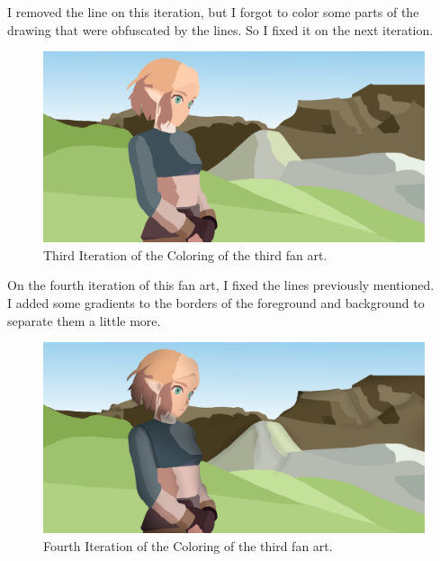 \documentclass{cup-pan}
\begin{document}
        I removed the line on this iteration, but I forgot to color some parts of the drawing that were obfuscated by the lines. So I fixed it on the next iteration.
        \begin{figure}[H]
            \includegraphics[width=\textwidth]{Fanart3/3_Color/III_Color.png}
            \caption{Third Iteration of the Coloring of the third fan art.}
        \end{figure}

        On the fourth iteration of this fan art, I fixed the lines previously mentioned.\\
        I added some gradients to the borders of the foreground and background to separate them a little more.\\
        \begin{figure}[H]
            \includegraphics[width=\textwidth]{Fanart3/3_Color/IIII_Color.png}
            \caption{Fourth Iteration of the Coloring of the third fan art.}
        \end{figure}
\end{document}
